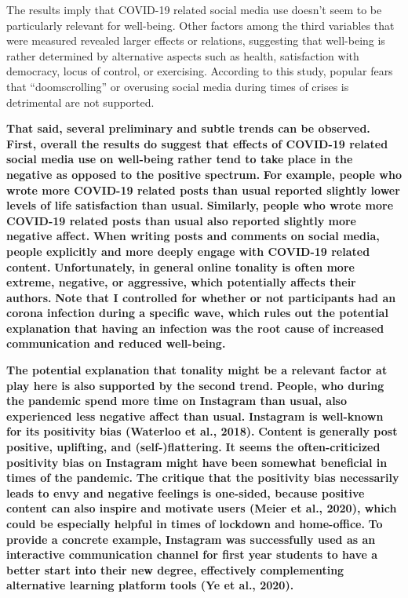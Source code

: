 \documentclass[
  man,mask]{apa7}
\begin{document}
The results imply that COVID-19 related social media use doesn't seem to be particularly relevant for well-being.
Other factors among the third variables that were measured revealed larger effects or relations, suggesting that well-being is rather determined by alternative aspects such as health, satisfaction with democracy, locus of control, or exercising.
According to this study, popular fears that ``doomscrolling'' or overusing social media during times of crises is detrimental are not supported.

\textbf{That said, several preliminary and subtle trends can be observed.}
\textbf{First, overall the results do suggest that effects of COVID-19 related social media use on well-being rather tend to take place in the negative as opposed to the positive spectrum.}
\textbf{For example, people who wrote more COVID-19 related posts than usual reported slightly lower levels of life satisfaction than usual.}
\textbf{Similarly, people who wrote more COVID-19 related posts than usual also reported slightly more negative affect.}
\textbf{When writing posts and comments on social media, people explicitly and more deeply engage with COVID-19 related content.}
\textbf{Unfortunately, in general online tonality is often more extreme, negative, or aggressive, which potentially affects their authors.}
\textbf{Note that I controlled for whether or not participants had an corona infection during a specific wave, which rules out the potential explanation that having an infection was the root cause of increased communication and reduced well-being.}

\textbf{The potential explanation that tonality might be a relevant factor at play here is also supported by the second trend.}
\textbf{People, who during the pandemic spend more time on Instagram than usual, also experienced less negative affect than usual.}
\textbf{Instagram is well-known for its positivity bias (Waterloo et al., 2018).}
\textbf{Content is generally post positive, uplifting, and (self-)flattering.}
\textbf{It seems the often-criticized positivity bias on Instagram might have been somewhat beneficial in times of the pandemic.}
\textbf{The critique that the positivity bias necessarily leads to envy and negative feelings is one-sided, because positive content can also inspire and motivate users (Meier et al., 2020), which could be especially helpful in times of lockdown and home-office.}
\textbf{To provide a concrete example, Instagram was successfully used as an interactive communication channel for first year students to have a better start into their new degree, effectively complementing alternative learning platform tools (Ye et al., 2020).}
\end{document}
